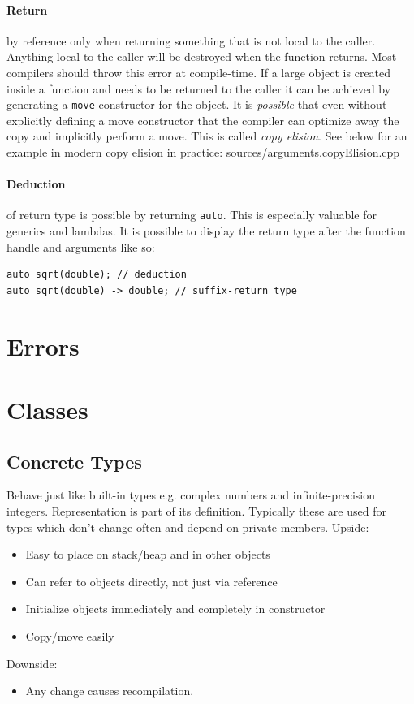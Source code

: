 \documentclass[a4paper, 10pt]{article}
\begin{document}
\paragraph{Return} by reference only when returning something that is not local to the caller. Anything local to the caller will be destroyed when the function returns. Most compilers should throw this error at compile-time. If a large object is created inside a function and needs to be returned to the caller it can be achieved by generating a \verb!move! constructor for the object. It is \textit{possible} that even without explicitly defining a move constructor that the compiler can optimize away the copy and implicitly perform a move. This is called \textit{copy elision}. See below for an example in modern copy elision in practice:
 {sources/arguments.copyElision.cpp}
\paragraph{Deduction} of return type is possible by returning \verb!auto!. This is especially valuable for generics and lambdas. It is possible to display the return type after the function handle and arguments like so:
\begin{lstlisting}[style=cpp]
auto sqrt(double); // deduction
auto sqrt(double) -> double; // suffix-return type
\end{lstlisting}

\pagebreak
\section{Errors}

\pagebreak
\section{Classes}
\subsection{Concrete Types}
Behave just like built-in types e.g. complex numbers and infinite-precision integers. Representation is part of its definition. Typically these are used for types which don't change often and depend on private members.
Upside:
\begin{itemize}
	\item Easy to place on stack/heap and in other objects
	\item Can refer to objects directly, not just via reference
	\item Initialize objects immediately and completely in constructor
	\item Copy/move easily
\end{itemize}
Downside:
\begin{itemize}
	\item Any change causes recompilation.
\end{itemize}
\end{document}

